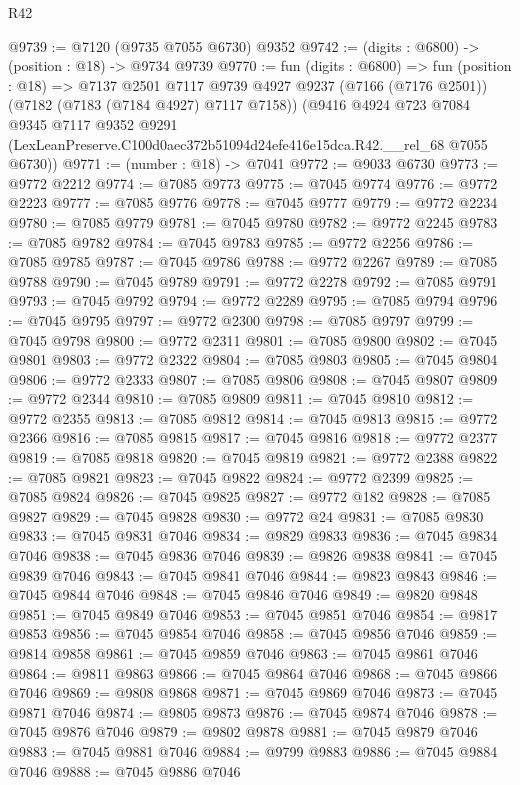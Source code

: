 \begin{lexlean}{R42}
\begin{coremodule}
{@9739 := @7120 (@9735 @7055 @6730) @9352
@9742 := (digits : @6800) -> (position : @18) -> @9734 @9739
@9770 := fun (digits : @6800) =>
  fun (position : @18) =>
  @7137
    @2501
    @7117
    @9739
    @4927
    @9237
    (@7166 (@7176 @2501))
    (@7182 (@7183 (@7184 @4927) @7117 @7158))
    (@9416
      @4924
      @723
      @7084
      @9345
      @7117
      @9352
      @9291
      (LexLeanPreserve.C100d0aec372b51094d24efe416e15dca.R42.__rel_68 @7055 @6730))
@9771 := (number : @18) -> @7041
@9772 := @9033 @6730
@9773 := @9772 @2212
@9774 := @7085 @9773
@9775 := @7045 @9774
@9776 := @9772 @2223
@9777 := @7085 @9776
@9778 := @7045 @9777
@9779 := @9772 @2234
@9780 := @7085 @9779
@9781 := @7045 @9780
@9782 := @9772 @2245
@9783 := @7085 @9782
@9784 := @7045 @9783
@9785 := @9772 @2256
@9786 := @7085 @9785
@9787 := @7045 @9786
@9788 := @9772 @2267
@9789 := @7085 @9788
@9790 := @7045 @9789
@9791 := @9772 @2278
@9792 := @7085 @9791
@9793 := @7045 @9792
@9794 := @9772 @2289
@9795 := @7085 @9794
@9796 := @7045 @9795
@9797 := @9772 @2300
@9798 := @7085 @9797
@9799 := @7045 @9798
@9800 := @9772 @2311
@9801 := @7085 @9800
@9802 := @7045 @9801
@9803 := @9772 @2322
@9804 := @7085 @9803
@9805 := @7045 @9804
@9806 := @9772 @2333
@9807 := @7085 @9806
@9808 := @7045 @9807
@9809 := @9772 @2344
@9810 := @7085 @9809
@9811 := @7045 @9810
@9812 := @9772 @2355
@9813 := @7085 @9812
@9814 := @7045 @9813
@9815 := @9772 @2366
@9816 := @7085 @9815
@9817 := @7045 @9816
@9818 := @9772 @2377
@9819 := @7085 @9818
@9820 := @7045 @9819
@9821 := @9772 @2388
@9822 := @7085 @9821
@9823 := @7045 @9822
@9824 := @9772 @2399
@9825 := @7085 @9824
@9826 := @7045 @9825
@9827 := @9772 @182
@9828 := @7085 @9827
@9829 := @7045 @9828
@9830 := @9772 @24
@9831 := @7085 @9830
@9833 := @7045 @9831 @7046
@9834 := @9829 @9833
@9836 := @7045 @9834 @7046
@9838 := @7045 @9836 @7046
@9839 := @9826 @9838
@9841 := @7045 @9839 @7046
@9843 := @7045 @9841 @7046
@9844 := @9823 @9843
@9846 := @7045 @9844 @7046
@9848 := @7045 @9846 @7046
@9849 := @9820 @9848
@9851 := @7045 @9849 @7046
@9853 := @7045 @9851 @7046
@9854 := @9817 @9853
@9856 := @7045 @9854 @7046
@9858 := @7045 @9856 @7046
@9859 := @9814 @9858
@9861 := @7045 @9859 @7046
@9863 := @7045 @9861 @7046
@9864 := @9811 @9863
@9866 := @7045 @9864 @7046
@9868 := @7045 @9866 @7046
@9869 := @9808 @9868
@9871 := @7045 @9869 @7046
@9873 := @7045 @9871 @7046
@9874 := @9805 @9873
@9876 := @7045 @9874 @7046
@9878 := @7045 @9876 @7046
@9879 := @9802 @9878
@9881 := @7045 @9879 @7046
@9883 := @7045 @9881 @7046
@9884 := @9799 @9883
@9886 := @7045 @9884 @7046
@9888 := @7045 @9886 @7046
}
\end{coremodule}
\end{lexlean}
